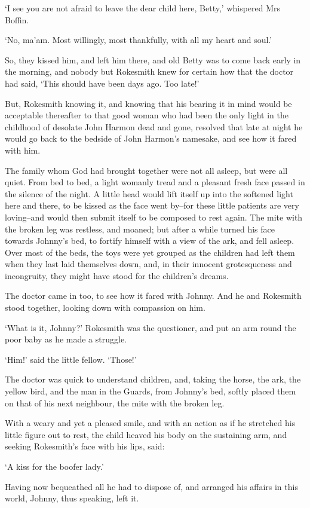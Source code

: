 ‘I see you are not afraid to leave the dear child here, Betty,’
whispered Mrs Boffin.

‘No, ma’am. Most willingly, most thankfully, with all my heart and
soul.’

So, they kissed him, and left him there, and old Betty was to come back
early in the morning, and nobody but Rokesmith knew for certain how that
the doctor had said, ‘This should have been days ago. Too late!’

But, Rokesmith knowing it, and knowing that his bearing it in mind would
be acceptable thereafter to that good woman who had been the only light
in the childhood of desolate John Harmon dead and gone, resolved that
late at night he would go back to the bedside of John Harmon’s namesake,
and see how it fared with him.

The family whom God had brought together were not all asleep, but were
all quiet. From bed to bed, a light womanly tread and a pleasant fresh
face passed in the silence of the night. A little head would lift itself
up into the softened light here and there, to be kissed as the face went
by--for these little patients are very loving--and would then submit
itself to be composed to rest again. The mite with the broken leg was
restless, and moaned; but after a while turned his face towards Johnny’s
bed, to fortify himself with a view of the ark, and fell asleep. Over
most of the beds, the toys were yet grouped as the children had left
them when they last laid themselves down, and, in their innocent
grotesqueness and incongruity, they might have stood for the children’s
dreams.

The doctor came in too, to see how it fared with Johnny. And he and
Rokesmith stood together, looking down with compassion on him.

‘What is it, Johnny?’ Rokesmith was the questioner, and put an arm round
the poor baby as he made a struggle.

‘Him!’ said the little fellow. ‘Those!’

The doctor was quick to understand children, and, taking the horse,
the ark, the yellow bird, and the man in the Guards, from Johnny’s bed,
softly placed them on that of his next neighbour, the mite with the
broken leg.

With a weary and yet a pleased smile, and with an action as if he
stretched his little figure out to rest, the child heaved his body on
the sustaining arm, and seeking Rokesmith’s face with his lips, said:

‘A kiss for the boofer lady.’

Having now bequeathed all he had to dispose of, and arranged his affairs
in this world, Johnny, thus speaking, left it.



